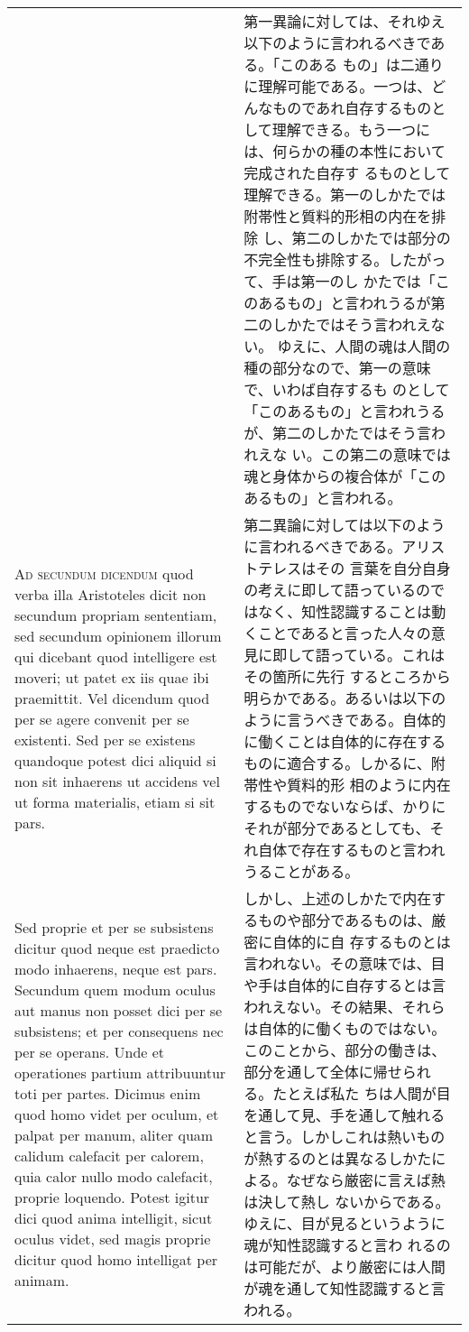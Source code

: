 \documentclass[paper=a4paper,fontsize=10pt,jafontsize=9pt,titlepage]{jlreq}
\begin{document}
\begin{longtable}{p{21em}p{21em}}
&

第一異論に対しては、それゆえ以下のように言われるべきである。「このある
もの」は二通りに理解可能である。一つは、どんなものであれ自存するものと
して理解できる。もう一つには、何らかの種の本性において完成された自存す
るものとして理解できる。第一のしかたでは附帯性と質料的形相の内在を排除
し、第二のしかたでは部分の不完全性も排除する。したがって、手は第一のし
かたでは「このあるもの」と言われうるが第二のしかたではそう言われえない。
ゆえに、人間の魂は人間の種の部分なので、第一の意味で、いわば自存するも
のとして「このあるもの」と言われうるが、第二のしかたではそう言われえな
い。この第二の意味では魂と身体からの複合体が「このあるもの」と言われる。


\\



{\scshape Ad secundum dicendum} quod verba illa Aristoteles dicit non
secundum propriam sententiam, sed secundum opinionem illorum qui
dicebant quod intelligere est moveri; ut patet ex iis quae ibi
praemittit. Vel dicendum quod per se agere convenit per se
existenti. Sed per se existens quandoque potest dici aliquid si non
sit inhaerens ut accidens vel ut forma materialis, etiam si sit pars.


&

第二異論に対しては以下のように言われるべきである。アリストテレスはその
言葉を自分自身の考えに即して語っているのではなく、知性認識することは動
くことであると言った人々の意見に即して語っている。これはその箇所に先行
するところから明らかである。あるいは以下のように言うべきである。自体的
に働くことは自体的に存在するものに適合する。しかるに、附帯性や質料的形
相のように内在するものでないならば、かりにそれが部分であるとしても、そ
れ自体で存在するものと言われうることがある。


\\

Sed proprie et per se subsistens dicitur quod neque est praedicto modo
inhaerens, neque est pars. Secundum quem modum oculus aut manus non
posset dici per se subsistens; et per consequens nec per se
operans. Unde et operationes partium attribuuntur toti per
partes. Dicimus enim quod homo videt per oculum, et palpat per manum,
aliter quam calidum calefacit per calorem, quia calor nullo modo
calefacit, proprie loquendo. Potest igitur dici quod anima intelligit,
sicut oculus videt, sed magis proprie dicitur quod homo intelligat per
animam.


&

しかし、上述のしかたで内在するものや部分であるものは、厳密に自体的に自
存するものとは言われない。その意味では、目や手は自体的に自存するとは言
 われえない。その結果、それらは自体的に働くものではない。
このことから、部分の働きは、部分を通して全体に帰せられる。たとえば私た
 ちは人間が目を通して見、手を通して触れると言う。しかしこれは熱いもの
 が熱するのとは異なるしかたによる。なぜなら厳密に言えば熱は決して熱し
 ないからである。ゆえに、目が見るというように魂が知性認識すると言わ
 れるのは可能だが、より厳密には人間が魂を通して知性認識すると言われる。



\end{longtable}
\end{document}
